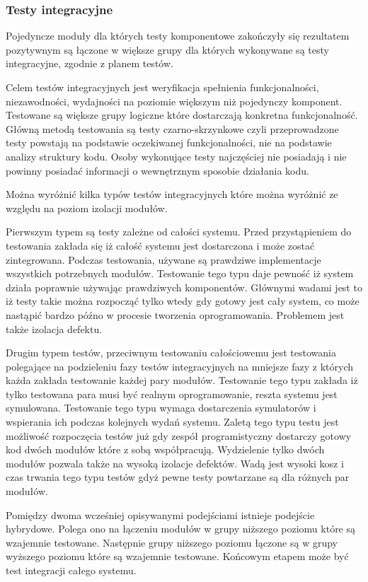\subsubsection{Testy integracyjne} 
Pojedyncze moduły dla których testy komponentowe zakończyły się rezultatem pozytywnym są łączone w większe grupy dla których wykonywane są testy integracyjne, zgodnie z planem testów.

Celem testów integracyjnych jest weryfikacja spełnienia funkcjonalności, niezawodności, wydajności na poziomie większym niż pojedynczy komponent. Testowane są większe grupy logiczne które dostarczają konkretna funkcjonalność. Główną metodą testowania są testy czarno-skrzynkowe czyli przeprowadzone testy powstają na podstawie oczekiwanej funkcjonalności, nie na podstawie analizy struktury kodu. Osoby wykonujące testy najczęściej nie posiadają i nie powinny posiadać informacji o wewnętrznym sposobie działania kodu.

Można wyróżnić kilka typów testów integracyjnych które można wyróżnić ze względu na poziom izolacji modułów.

Pierwszym typem są testy zależne od całości systemu. Przed przystąpieniem do testowania zakłada się iż całość systemu jest dostarczona i może zostać zintegrowana.  Podczas testowania, używane są prawdziwe implementacje wszystkich potrzebnych modułów. Testowanie tego typu daje pewność iż system działa poprawnie używając prawdziwych komponentów. Głównymi wadami jest to iż testy takie można rozpocząć tylko wtedy gdy gotowy jest cały system, co może nastąpić bardzo późno w procesie tworzenia oprogramowania. Problemem jest także izolacja defektu.

Drugim typem testów, przeciwnym testowaniu całościowemu jest testowania polegające na podzieleniu fazy testów integracyjnych na mniejsze fazy z których każda zakłada testowanie każdej pary modułów. Testowanie tego typu zakłada iż tylko testowana para musi być realnym oprogramowanie, reszta systemu jest symulowana. Testowanie tego typu wymaga dostarczenia symulatorów i wspierania ich podczas kolejnych wydań systemu. Zaletą tego typu testu jest możliwość rozpoczęcia testów już gdy zespół programistyczny dostarczy gotowy kod dwóch modułów które z sobą współpracują. Wydzielenie tylko dwóch modułów pozwala także na wysoką izolacje defektów. Wadą jest wysoki kosz i czas trwania tego typu testów gdyż pewne testy powtarzane są dla różnych par modułów.

Pomiędzy dwoma wcześniej opisywanymi podejściami istnieje podejście hybrydowe. Polega ono na łączeniu modułów w grupy niższego poziomu które są wzajemnie testowane. Następnie grupy niższego poziomu łączone są w grupy wyższego poziomu które są wzajemnie testowane. Końcowym etapem może być test integracji całego systemu.

